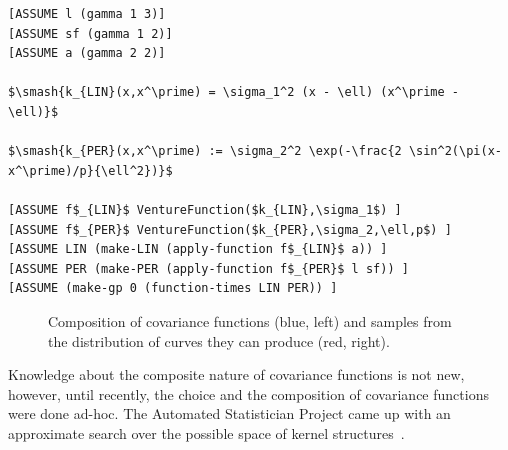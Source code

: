 \documentclass{article} %
\begin{document}
\begin{minipage}{\linewidth}

\begin{lstlisting}[frame=single,label=alg:gpNeal,caption=LIN $\times$ PER,mathescape]
[ASSUME l (gamma 1 3)]
[ASSUME sf (gamma 1 2)]
[ASSUME a (gamma 2 2)]

$\smash{k_{LIN}(x,x^\prime) = \sigma_1^2 (x - \ell) (x^\prime - \ell)}$

$\smash{k_{PER}(x,x^\prime) := \sigma_2^2 \exp(-\frac{2 \sin^2(\pi(x-x^\prime)/p}{\ell^2})}$

[ASSUME f$_{LIN}$ VentureFunction($k_{LIN},\sigma_1$) ]
[ASSUME f$_{PER}$ VentureFunction($k_{PER},\sigma_2,\ell,p$) ]
[ASSUME LIN (make-LIN (apply-function f$_{LIN}$ a)) ]
[ASSUME PER (make-PER (apply-function f$_{PER}$ l sf)) ]
[ASSUME (make-gp 0 (function-times LIN PER)) ]
\end{lstlisting}

\end{minipage}




\begin{figure}[p]
\centering
    \label{fig:composite}
    \caption{Composition of covariance functions (blue, left) and samples from the distribution of curves they can produce (red, right).}
\end{figure}

Knowledge about the composite nature of covariance functions is not new, however, until recently, the choice and the composition of covariance functions were done ad-hoc. The Automated Statistician Project came up with an approximate search over the possible space of kernel structures~\citep{duvenaud2013structure,lloyd2014automatic}. 
\end{document}
